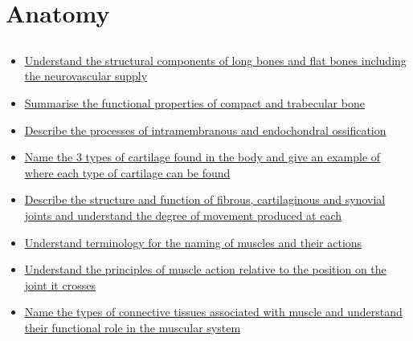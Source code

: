 \documentclass[10pt, a4paper]{article}
\newcommand{\MYhref}[3][blue]{\href{#2}{\color{#1}{#3}}}%
\begin{document}
\section{Anatomy}
\subsection{\MYhref[melbBlue]{https://notion.so/ae4a4e126e2148bf98ee85747eeb6d2f}{Foundations of the Skeletal, Articular and Muscular Systems}} \begin{itemize} \item \href{https://www.notion.so/2093c89b619848cf8682621738198af8}{Understand the structural components of long bones and flat bones including the neurovascular supply } \item \href{https://www.notion.so/e0f648d9053a4c209b498263d50acf19}{Summarise the functional properties of compact and trabecular bone} \item \href{https://www.notion.so/a5f60b7446204215b8c7420bae6ef034}{Describe the processes of intramembranous and endochondral ossification} \item \href{https://www.notion.so/ab94a8681cf54ed0810dae281dee9735}{Name the 3 types of cartilage found in the body and give an example of where each type of cartilage can be found} \item \href{https://www.notion.so/350df500b4214b198c356a60a27000bb}{Describe the structure and function of fibrous, cartilaginous and synovial joints and understand the degree of movement produced at each} \item \href{https://www.notion.so/05249dcd97e54f9987c168e39ce128ff}{Understand terminology for the naming of muscles and their actions } \item \href{https://www.notion.so/281d585c94af4a00b38638a631c28d59}{Understand the principles of muscle action relative to the position on the joint it crosses } \item \href{https://www.notion.so/61210998b9044007bf4cd37081fca7c3}{Name the types of connective tissues associated with muscle and understand their functional role in the muscular system} \end{itemize}
\end{document}
